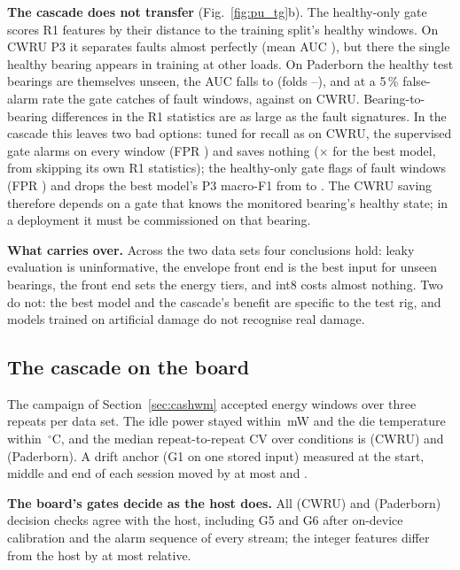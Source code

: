 \textbf{The cascade does not transfer} (Fig.~\ref{fig:pu_tg}b). The healthy-only gate scores R1 features by their
distance to the training split's healthy windows. On CWRU P3 it separates faults almost perfectly (mean AUC
\NumPuGateAucCwru{}), but there the single healthy bearing appears in training at other loads. On Paderborn the
healthy test bearings are themselves unseen, the AUC falls to \NumPuGateAucPu{} (folds
\NumPuGateAucPuMin{}--\NumPuGateAucPuMax{}), and at a 5\,\% false-alarm rate the gate catches \NumPuGateRecallFivePu{}
of fault windows, against \NumPuGateRecallFiveCwru{} on CWRU. Bearing-to-bearing differences in the R1 statistics are
as large as the fault signatures. In the cascade this leaves two bad options: tuned for recall as on CWRU, the
supervised gate alarms on every window (FPR \NumPuCasSupFpr{}) and saves nothing (\NumPuCasEitherSave{}$\times$ for the
best model, from skipping its own R1 statistics); the healthy-only gate flags \NumPuCasHealthyTpr{} of fault windows
(FPR \NumPuCasHealthyFpr{}) and drops the best model's P3 macro-F1 from \NumPuPThreeBest{} to \NumPuCasHealthyFOne{}.
The CWRU saving therefore depends on a gate that knows the monitored bearing's healthy state; in a deployment it
must be commissioned on that bearing.

\textbf{What carries over.} Across the two data sets four conclusions hold: leaky evaluation is uninformative, the
envelope front end is the best input for unseen bearings, the front end sets the energy tiers, and int8 costs almost
nothing. Two do not: the best model and the cascade's benefit are specific to the test rig, and models trained on
artificial damage do not recognise real damage.

\subsection{The cascade on the board}
\label{sec:cashw}
The campaign of Section~\ref{sec:cashwm} accepted \NumChWindows{} energy windows over three repeats per data set. The
idle power stayed within \NumChIdle{}\,mW and the die temperature within \NumChTemp{}\,$^\circ$C, and the median
repeat-to-repeat CV over conditions is \NumChCwCvMed{} (CWRU) and \NumChPuCvMed{} (Paderborn). A drift anchor
(G1 on one stored input) measured at the start, middle and end of each session moved by at most \NumChCwAnchorDrift{}
and \NumChPuAnchorDrift{}.

\textbf{The board's gates decide as the host does.} All \NumChCwChecks{} (CWRU) and \NumChPuChecks{} (Paderborn)
decision checks agree with the host, including G5 and G6 after on-device calibration and the alarm sequence of
every stream; the integer features differ from the host by at most \NumChCwFxErr{} relative.

